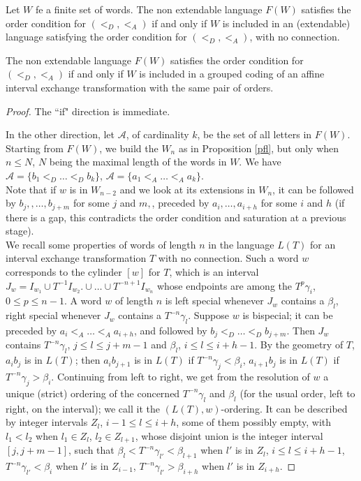 \documentclass[10pt,a4paper]{amsart}
\begin{document}
\begin{proposition}\label{pfl}
Let $W$ fe a finite set of words. The non extendable language $F(W)$ satisfies the order condition for  $(<_D,<_A)$ if and only if $W$ is included in an (extendable) language satisfying the order condition for $(<_D,<_A)$, with no connection.
\end{proposition}

\begin{proposition}\label{pfl2}
The non extendable language $F(W)$ satisfies the order condition for  $(<_D,<_A)$ if and only if $W$ is included in a grouped coding of
an affine interval exchange transformation with the same pair of  orders.\end{proposition}

\begin{proof}
The ``if" direction is immediate. 

In the other direction, let $\mathcal A$, of cardinality $k$, be the set of all letters in  $F(W).$ Starting from $F(W)$, we build the $W_n$ as in Proposition \ref{pfl}, but only   when $n\leq N$, $N$ being  the maximal length of the words in $W$.  We have  $\mathcal A=\{b_1<_D\ldots <_D b_k\}$,  $\mathcal A=\{a_1<_A\ldots <_A a_k\}$. \\
 Note that if $w$ is in $W_{n-2}$  and we look at its extensions in $W_n$, it can be followed by $b_j,,\ldots ,b_{j+m}$ for some $j$ and $m,$, preceded by $a_i, \ldots ,a_{i+h}$ for some $i$ and $h$ (if there is a gap, this contradicts the order condition and saturation at a  previous stage). \\


We recall  some properties of words of length $n$ in the language $L(T)$ for an interval exchange transformation $T$ with no connection. Such a word $w$ corresponds to  the cylinder $[w]$ for $T$, which is an interval $J_w=I_{w_1}\cup T^{-1}I_{w_2}.\cup \ldots \cup T^{-n+1}I_{w_n}$ whose endpoints are among the $T^p\gamma_i$, $0\leq p\leq n-1$.   
A word $w$ of  length $n$ is left 
special whenever $J_w$ contains a $\beta_l$, right special whenever $J_w$ contains a $T^{-n}\gamma_l$. Suppose  $w$ is bispecial; it can be preceded by $a_i<_A\ldots <_A a_{i+h}$, and followed by $b_j<_D\ldots <_D b_{j+m}$. Then $J_w$ contains $T^{-n}\gamma_l$, $j \leq l\leq j+m-1$
and $\beta_l$, $i \leq l\leq i+h-1$. By the geometry of $T$, $a_ib_j$ is in $L(T)$; then $a_ib_{j+1}$ is in $L(T)$ if $T^{-n}\gamma_j<\beta_i$, $a_{i+1}b_j$ is in $L(T)$ if $T^{-n}\gamma_j>\beta_i$. Continuing from left to right, we get from the resolution of $w$ a unique (strict) ordering
 of the concerned $T^{-n}\gamma_l$ and $\beta_l$ (for the usual order, left to right, on the interval); we call it the $(L(T), w)$-ordering. It can be described by integer intervals $Z_l$, $i-1\leq l\leq i+h$, some of them possibly empty, with $l_1<l_2$ when $l_1\in Z_l$, $l_2\in Z_{l+1}$,
 whose disjoint union is the integer interval $[j,j+m-1]$, such  that $\beta_l<T^{-n}\gamma_{l'}< \beta_{l+1}$ when $l'$ is in $Z_l$, $i \leq l\leq i+h-1$, $T^{-n}\gamma_{l'}< \beta_{i}$ when $l'$ is in $Z_{i-1}$, $T^{-n}\gamma_{l'}> \beta_{i+h}$ when $l'$ is in $Z_{i+h}$.
 

\end{proof}
\end{document}
